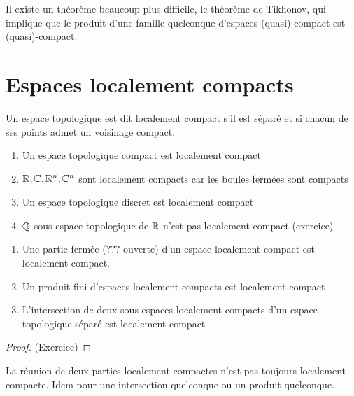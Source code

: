\documentclass[]{report}
\begin{document}
    \begin{re}{}{}
        Il existe un théorème beaucoup plus difficile, le théorème de Tikhonov, qui implique que le produit d'une famille quelconque d'espaces (quasi)-compact est (quasi)-compact.
    \end{re}

    \section{Espaces localement compacts}

    \begin{df}{}{}
        Un espace topologique est dit localement compact s'il est séparé et si chacun de ses points admet un voisinage compact.
    \end{df}

    \begin{ex}{}{}
        \begin{enumerate}
            \item Un espace topologique compact est localement compact 
            \item $\mathbb{R},\mathbb{C},\mathbb{R}^n,\mathbb{C}^n$ sont localement compacts car les boules fermées sont compacts
            \item Un espace topologique discret est localement compact
            \item $\mathbb{Q}$ sous-espace topologique de $\mathbb{R}$ n'est pas localement compact (exercice)
        \end{enumerate}
    \end{ex}

    \begin{prop}{}{}
        \begin{enumerate}
            \item Une partie fermée (??? ouverte) d'un espace localement compact est localement compact.
            \item Un produit fini d'espaces localement compacts est localement compact
            \item L'intersection de deux sous-espaces localement compacts d'un espace topologique séparé est localement compact
        \end{enumerate}
    \end{prop}

    \begin{proof}
        (Exercice)
    \end{proof}

    \begin{re}{}{}
        La réunion de deux parties localement compactes n'est pas toujours localement compacte. Idem pour une intersection quelconque ou un produit quelconque.
    \end{re}
\end{document}
